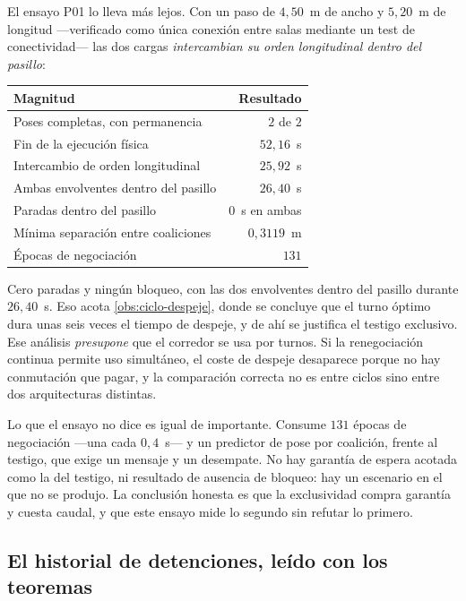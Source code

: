 \begin{observacion}
\label{obs:ensayo-cuestiona}
El ensayo P01 lo lleva más lejos. Con un paso de $4{,}50$~m de ancho y
$5{,}20$~m de longitud —verificado como única conexión entre salas mediante un
test de conectividad— las dos cargas \emph{intercambian su orden longitudinal
dentro del pasillo}:

\begin{center}\small
\begin{tabular}{@{}lr@{}}
\toprule
Magnitud & Resultado \\
\midrule
Poses completas, con permanencia & $2$ de $2$ \\
Fin de la ejecución física & $52{,}16$~s \\
Intercambio de orden longitudinal & $25{,}92$~s \\
Ambas envolventes dentro del pasillo & $26{,}40$~s \\
Paradas dentro del pasillo & $0$~s en ambas \\
Mínima separación entre coaliciones & $0{,}3119$~m \\
Épocas de negociación & $131$ \\
\bottomrule
\end{tabular}
\end{center}

Cero paradas y ningún bloqueo, con las dos envolventes dentro del pasillo durante
$26{,}40$~s. Eso acota \cref{obs:ciclo-despeje}, donde se concluye que
el turno óptimo dura unas seis veces el tiempo de despeje, y de ahí se justifica
el testigo exclusivo. Ese análisis \emph{presupone} que el corredor se usa por
turnos. Si la renegociación continua permite uso simultáneo, el coste de despeje
desaparece porque no hay conmutación que pagar, y la comparación correcta no es
entre ciclos sino entre dos arquitecturas distintas.

Lo que el ensayo no dice es igual de importante. Consume $131$ épocas de
negociación —una cada $0{,}4$~s— y un predictor de pose por coalición, frente al
testigo, que exige un mensaje y un desempate. No hay garantía de espera acotada
como la del testigo, ni resultado de ausencia de bloqueo: hay un escenario en el
que no se produjo. La conclusión honesta es que la exclusividad compra garantía y
cuesta caudal, y que este ensayo mide lo segundo sin refutar lo primero.
\end{observacion}

\subsection{El historial de detenciones, leído con los teoremas}

